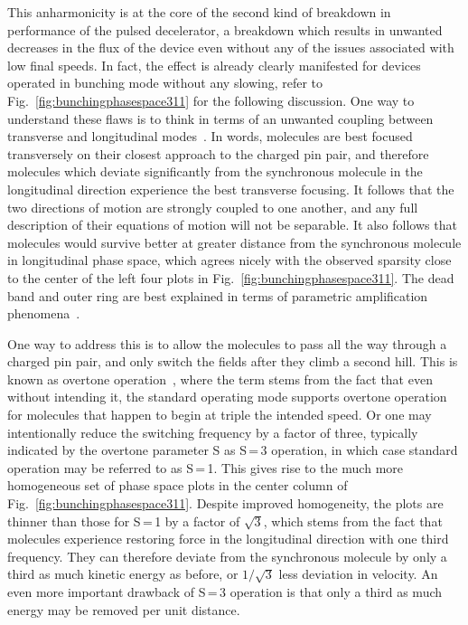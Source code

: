This anharmonicity is at the core of the second kind of breakdown in performance of the pulsed decelerator, a breakdown which results in unwanted decreases in the flux of the device even without any of the issues associated with low final speeds.
In fact, the effect is already clearly manifested for devices operated in bunching mode without any slowing, refer to Fig.~\ref{fig:bunchingphasespace311} for the following discussion.
One way to understand these flaws is to think in terms of an unwanted coupling between transverse and longitudinal modes~\cite{VanDeMeerakker2006}.
In words, molecules are best focused transversely on their closest approach to the charged pin pair, and therefore molecules which deviate significantly from the synchronous molecule in the longitudinal direction experience the best transverse focusing.
It follows that the two directions of motion are strongly coupled to one another, and any full description of their equations of motion will not be separable.
It also follows that molecules would survive better at greater distance from the synchronous molecule in longitudinal phase space, which agrees nicely with the observed sparsity close to the center of the left four plots in Fig.~\ref{fig:bunchingphasespace311}.
The dead band and outer ring are best explained in terms of parametric amplification phenomena~\cite{VanDeMeerakker2006}.

One way to address this is to allow the molecules to pass all the way through a charged pin pair, and only switch the fields after they climb a second hill.
This is known as overtone operation~\cite{VanDeMeerakker2005a}, where the term stems from the fact that even without intending it, the standard operating mode supports overtone operation for molecules that happen to begin at triple the intended speed.
Or one may intentionally reduce the switching frequency by a factor of three, typically indicated by the overtone parameter S as S\,=\,3 operation, in which case standard operation may be referred to as S\,=\,1.
This gives rise to the much more homogeneous set of phase space plots in the center column of Fig.~\ref{fig:bunchingphasespace311}.
Despite improved homogeneity, the plots are thinner than those for S\,=\,1 by a factor of $\sqrt{3}$, which stems from the fact that molecules experience restoring force in the longitudinal direction with one third frequency. 
They can therefore deviate from the synchronous molecule by only a third as much kinetic energy as before, or $1/\sqrt{3}$ less deviation in velocity.
An even more important drawback of S\,=\,3 operation is that only a third as much energy may be removed per unit distance.

